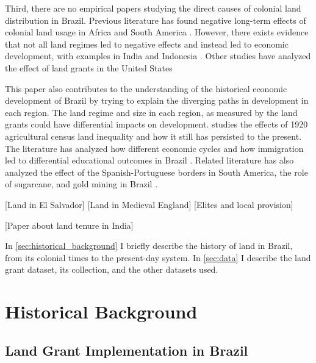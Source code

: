 \documentclass{article}
\begin{document}
Third, there are no empirical papers studying the direct causes of colonial land distribution in Brazil. 
Previous literature has found negative long-term effects of colonial land usage in Africa and South America \parencites{Dell2010-qt}{Lowes2021-ww}. 
However, there exists evidence that not all land regimes led to negative effects and instead led to economic development, with examples in India and Indonesia \parencites{Banerjee2005-ki}{Dell2019-np}{Ratnoo2023-vw}.  
Other studies have analyzed the effect of land grants in the United States \parencites{Akee2014-uw}{Allen2019-kh}{Smith2023-ip}

This paper also contributes to the understanding of the historical economic development of Brazil by trying to explain the diverging paths in development in each region. 
The land regime and size in each region, as measured by the land grants could have differential impacts on development.
\textcite{Wigton-Jones2020-ex} studies the effects of 1920 agricultural census land inequality and how it still has persisted to the present.
The literature has analyzed how different economic cycles and how immigration led to differential educational outcomes in Brazil \parencites{Musacchio2014-pq}{Rocha2017-yq}{de-Carvalho-Filho2012-pc}.
Related literature has also analyzed the effect of the Spanish-Portuguese borders in South America, the role of sugarcane, and gold mining in Brazil \parencites{Laudares2022-vy}{Naritomi2012-or}.

\parencite{Dell2010-qt}
\parencite{Sokoloff2000-mb}
\parencite{Montero2022-vl}
\parencite{Montero2022-ua}[Land in El Salvador]
\parencite{Reed2012-qy}[Land in Medieval England]
\parencite{Goni2022-do}[Elites and local provision]


\textcite{Ratnoo2023-vw} [Paper about land tenure in India]

\textcite{Albertus2018-bf}

In \autoref{sec:historical_background} I briefly describe the history of land in Brazil, from its colonial times to the present-day system. In \autoref{sec:data} I describe the land grant dataset, its collection, and the other datasets used.

\section{Historical Background}
\label{sec:historical_background}

\subsection{Land Grant Implementation in Brazil}
\end{document}
